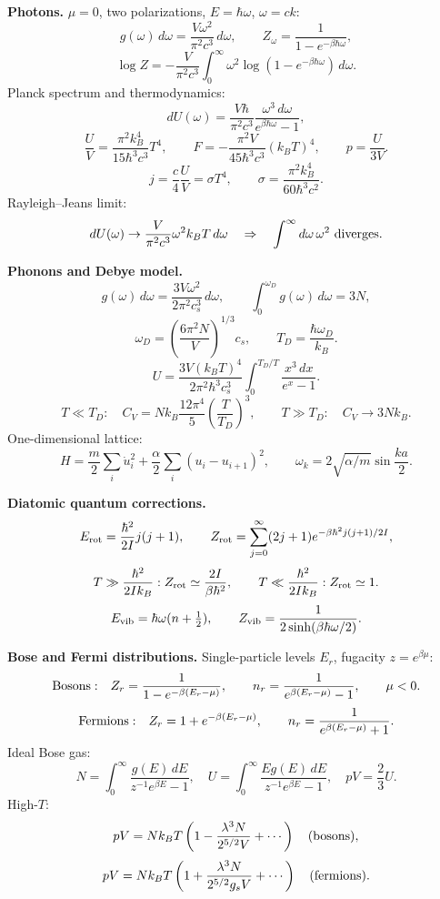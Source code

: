 \noindent\textbf{Photons.}\quad
$\mu=0$, two polarizations, $E=\hbar\omega$, $\omega=ck$:
\[
g(\omega)\,d\omega=\frac{V\omega^2}{\pi^2c^3}\,d\omega,
\qquad
Z_\omega=\frac{1}{1-e^{-\beta\hbar\omega}},
\]
\[
\log Z=-\frac{V}{\pi^2c^3}\int_0^\infty
\omega^2\log(1-e^{-\beta\hbar\omega})\,d\omega.
\]
Planck spectrum and thermodynamics:
\[
dU(\omega)=\frac{V\hbar}{\pi^2c^3}
\frac{\omega^3\,d\omega}{e^{\beta\hbar\omega}-1},
\]
\[
\boxed{\frac{U}{V}=\frac{\pi^2k_B^4}{15\hbar^3c^3}T^4},
\qquad
F=-\frac{\pi^2V}{45\hbar^3c^3}(k_BT)^4,
\qquad
\boxed{p=\frac{U}{3V}}.
\]
\[
j=\frac{c}{4}\frac{U}{V}=\sigma T^4,
\qquad
\sigma=\frac{\pi^2k_B^4}{60\hbar^3c^2}.
\]
Rayleigh--Jeans limit:
\[
dU(\omega)\to\frac{V}{\pi^2c^3}\omega^2k_BT\,d\omega
\quad\Rightarrow\quad \int^\infty d\omega\,\omega^2\ {\rm diverges}.
\]

\noindent\textbf{Phonons and Debye model.}\quad
\[
g(\omega)\,d\omega=\frac{3V\omega^2}{2\pi^2c_s^3}\,d\omega,
\qquad
\int_0^{\omega_D}g(\omega)\,d\omega=3N,
\]
\[
\boxed{\omega_D=\left(\frac{6\pi^2N}{V}\right)^{1/3}c_s},
\qquad T_D=\frac{\hbar\omega_D}{k_B}.
\]
\[
U=\frac{3V(k_BT)^4}{2\pi^2\hbar^3c_s^3}
\int_0^{T_D/T}\frac{x^3\,dx}{e^x-1}.
\]
\[
T\ll T_D:\quad
\boxed{C_V=Nk_B\frac{12\pi^4}{5}\left(\frac{T}{T_D}\right)^3},
\qquad
T\gg T_D:\quad \boxed{C_V\to3Nk_B}.
\]
One-dimensional lattice:
\[
H=\frac{m}{2}\sum_i\dot u_i^2+\frac{\alpha}{2}\sum_i(u_i-u_{i+1})^2,
\qquad
\omega_k=2\sqrt{\alpha/m}\sin\frac{ka}{2}.
\]

\noindent\textbf{Diatomic quantum corrections.}\quad
\[
E_{\rm rot}=\frac{\hbar^2}{2I}j(j+1),
\qquad
Z_{\rm rot}=\sum_{j=0}^\infty(2j+1)e^{-\beta\hbar^2j(j+1)/2I},
\]
\[
T\gg\frac{\hbar^2}{2Ik_B}: Z_{\rm rot}\simeq\frac{2I}{\beta\hbar^2},
\qquad
T\ll\frac{\hbar^2}{2Ik_B}: Z_{\rm rot}\simeq1.
\]
\[
E_{\rm vib}=\hbar\omega(n+\tfrac12),
\qquad
Z_{\rm vib}=\frac{1}{2\sinh(\beta\hbar\omega/2)}.
\]

\noindent\textbf{Bose and Fermi distributions.}\quad
Single-particle levels $E_r$, fugacity $z=e^{\beta\mu}$:
\[
{\rm Bosons:}\quad
Z_r=\frac{1}{1-e^{-\beta(E_r-\mu)}},
\qquad
n_r=\frac{1}{e^{\beta(E_r-\mu)}-1},
\qquad \mu<0.
\]
\[
{\rm Fermions:}\quad
Z_r=1+e^{-\beta(E_r-\mu)},
\qquad
n_r=\frac{1}{e^{\beta(E_r-\mu)}+1}.
\]
Ideal Bose gas:
\[
N=\int_0^\infty\frac{g(E)\,dE}{z^{-1}e^{\beta E}-1},
\quad
U=\int_0^\infty\frac{Eg(E)\,dE}{z^{-1}e^{\beta E}-1},
\quad
pV=\frac23U.
\]
High-$T$:
\[
pV=Nk_BT\left(1-\frac{\lambda^3N}{2^{5/2}V}+\cdots\right)
\quad({\rm bosons}),
\]
\[
pV=Nk_BT\left(1+\frac{\lambda^3N}{2^{5/2}g_sV}+\cdots\right)
\quad({\rm fermions}).
\]

